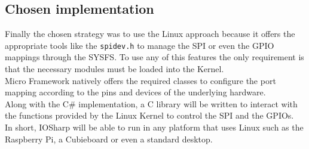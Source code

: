 \subsection{Chosen implementation}\label{SS:IOSharp-choosen}
Finally the chosen strategy was to use the Linux approach because it offers the appropriate tools like the \verb!spidev.h! to manage the SPI or even the GPIO mappings through the \gls{SYSFS}. To use any of this features the only requirement is that the necessary modules must be loaded into the Kernel.
\\
Micro Framework natively offers the required classes to configure the port mapping according to the pins and devices of the underlying hardware.
\\
Along with the C\# implementation, a C library will be written to interact with the functions provided by the Linux Kernel to control the \gls{SPI} and the \gls{GPIO}s.
\\
In short, IOSharp will be able to run in any platform that uses Linux such as the Raspberry Pi, a Cubieboard or even a standard desktop.

